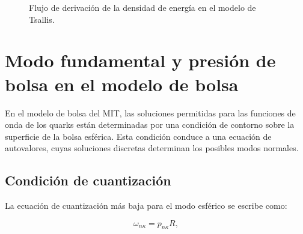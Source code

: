 \begin{figure}[H]
\centering
{}
\caption{Flujo de derivación de la densidad de energía en el modelo de Tsallis.}
\label{fig:derivation-flow}
\end{figure}
\section{Modo fundamental y presión de bolsa en el modelo de bolsa}
\label{app:bag-pressure}

En el modelo de bolsa del MIT, las soluciones permitidas para las funciones de onda de los quarks están determinadas por una condición de contorno sobre la superficie de la bolsa esférica. Esta condición conduce a una ecuación de autovalores, cuyas soluciones discretas determinan los posibles modos normales.

\subsection{Condición de cuantización}

La ecuación de cuantización más baja para el modo esférico se escribe como:

\begin{equation}
\omega_{n\kappa} = p_{n\kappa} R,
\end{equation}

